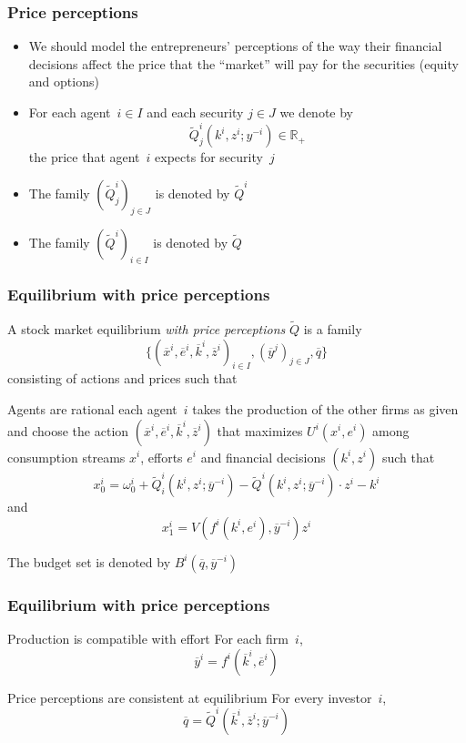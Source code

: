 \documentclass[blue]{beamer}
\def\R{\mathbb{R}}
\theoremstyle{definition}
\theoremstyle{example}
\begin{document}

\begin{frame}\frametitle{Price perceptions}

\begin{itemize}
\item We should model the entrepreneurs' perceptions of the way their financial decisions affect the price that the ``market'' will pay for the securities (equity and options)
\item For each agent~$i\in I$ and each security $j\in J$ we denote by
\[
\widetilde{Q}^i_j (k^i,z^i;y^{-i}) \in \R_+
\]
the price that agent~$i$ expects for security~$j$
\item The family $(\widetilde{Q}^i_j)_{j\in J}$ is denoted by $\widetilde{Q}^i$
\item The family $(\widetilde{Q}^i)_{i\in I}$ is denoted by $\widetilde{Q}$
\end{itemize}

\end{frame}



\begin{frame}\frametitle{Equilibrium with price perceptions}

A stock market equilibrium \emph{with price perceptions} $\widetilde{Q}$ is a family
\[
\{(\overline{x}^i,\overline{e}^i,\overline{k}^i,\overline{z}^i)_{i\in I},(\overline{y}^j)_{j\in J},\overline{q}\}
\]
consisting of actions and prices such that
\begin{block}{Agents are rational}
each agent~$i$ takes the production of the other firms as given and choose the action $(\overline{x}^i,\overline{e}^i,\overline{k}^i,\overline{z}^i)$ that maximizes $U^i(x^i,e^i)$ among consumption
streams ${x}^i$, efforts ${e}^i$ and financial decisions $({k}^i,{z}^i)$ such that
    \[
    {x}^i_0 = \omega^i_0 + \widetilde{Q}^i_i({k}^i,{z}^i;\overline{y}^{-i}) - \widetilde{Q}^i({k}^i,{z}^i;\overline{y}^{-i}) \cdot {z}^i - {k}^i
    \]
    and
    \[
    {x}^i_1 = V(f^i({k}^i,{e}^i),\overline{y}^{-i}){z}^i
    \]
\end{block}

The budget set is denoted by $B^i(\overline{q},\overline{y}^{-i})$

\end{frame}



\begin{frame}\frametitle{Equilibrium with price perceptions}

\begin{block}{Production is compatible with effort}
For each firm~$i$,
\[
\overline{y}^i = f^i(\overline{k}^i,\overline{e}^i)
\]
\end{block}

\begin{block}{Price perceptions are consistent at equilibrium}
For every investor~$i$,
\[
\overline{q} = \widetilde{Q}^i(\overline{k}^i,\overline{z}^i;\overline{y}^{-i})
\]
\end{block}

\end{frame}
\end{document}
